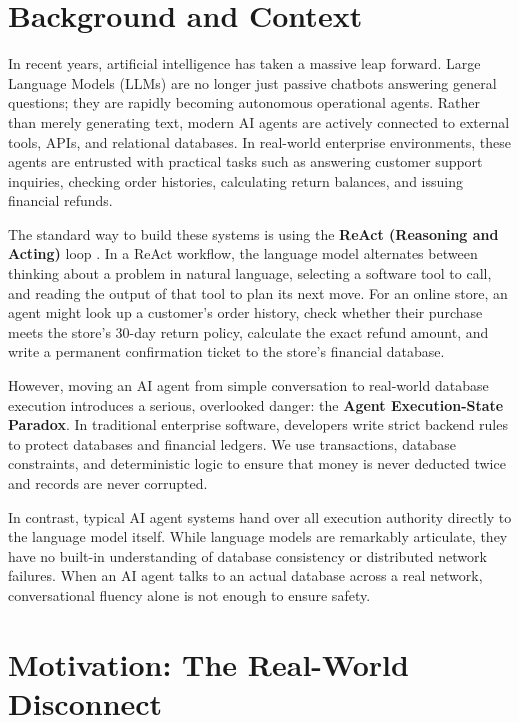 
\section{Background and Context}

In recent years, artificial intelligence has taken a massive leap forward. Large Language Models (LLMs) are no longer just passive chatbots answering general questions; they are rapidly becoming autonomous operational agents. Rather than merely generating text, modern AI agents are actively connected to external tools, APIs, and relational databases. In real-world enterprise environments, these agents are entrusted with practical tasks such as answering customer support inquiries, checking order histories, calculating return balances, and issuing financial refunds.

The standard way to build these systems is using the \textbf{ReAct (Reasoning and Acting)} loop \cite{yao2022react}. In a ReAct workflow, the language model alternates between thinking about a problem in natural language, selecting a software tool to call, and reading the output of that tool to plan its next move. For an online store, an agent might look up a customer's order history, check whether their purchase meets the store's 30-day return policy, calculate the exact refund amount, and write a permanent confirmation ticket to the store's financial database.

However, moving an AI agent from simple conversation to real-world database execution introduces a serious, overlooked danger: the \textbf{Agent Execution-State Paradox}. In traditional enterprise software, developers write strict backend rules to protect databases and financial ledgers. We use transactions, database constraints, and deterministic logic to ensure that money is never deducted twice and records are never corrupted. 

In contrast, typical AI agent systems hand over all execution authority directly to the language model itself. While language models are remarkably articulate, they have no built-in understanding of database consistency or distributed network failures. When an AI agent talks to an actual database across a real network, conversational fluency alone is not enough to ensure safety.

\section{Motivation: The Real-World Disconnect}

